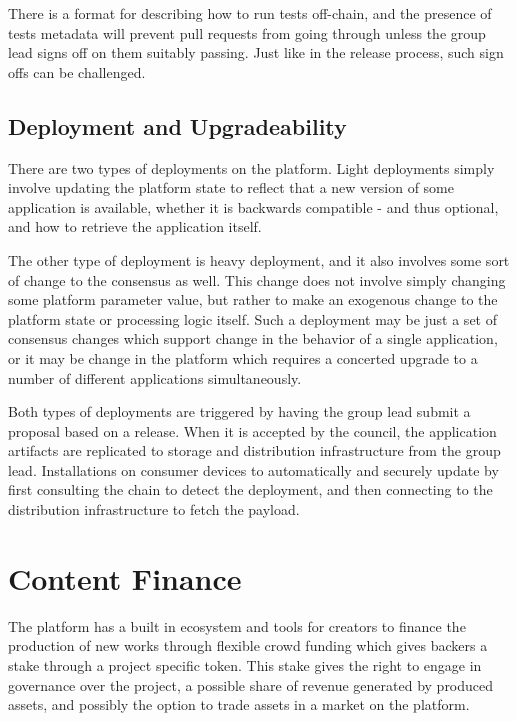 \documentclass{article}
\begin{document}
There is a format for describing how to run tests off-chain, and the presence of tests metadata will prevent pull requests from going through unless the group lead signs off on them suitably passing. Just like in the release process, such sign offs can be challenged.


\subsection{Deployment and Upgradeability}

There are two types of deployments on the platform. Light deployments simply involve updating the platform state to reflect that a new version of some application is available, whether it is backwards compatible - and thus optional, and how to retrieve the application itself.

The other type of deployment is heavy deployment, and it also involves some sort of change to the consensus as well. This change does not involve simply changing some platform parameter value, but rather to make an exogenous change to the platform state or processing logic itself. Such a deployment may be just a set of consensus changes which support change in the behavior of a single application, or it may be change in the platform which requires a concerted upgrade to a number of different applications simultaneously.

Both types of deployments are triggered by having the group lead submit a proposal based on a release. When it is accepted by the council, the application artifacts are replicated to storage and distribution infrastructure from the group lead. Installations on consumer devices to automatically and securely update by first consulting the chain to detect the deployment, and then connecting to the distribution infrastructure to fetch the payload.


\section{Content Finance} \label{sec:content_finance}

The platform has a built in ecosystem and tools for creators to finance the production of new works through flexible crowd funding which gives backers a stake through a project specific token. This stake gives the right to engage in governance over the project, a possible share of revenue generated by produced assets, and possibly the option to trade assets in a market on the platform.
\end{document}
